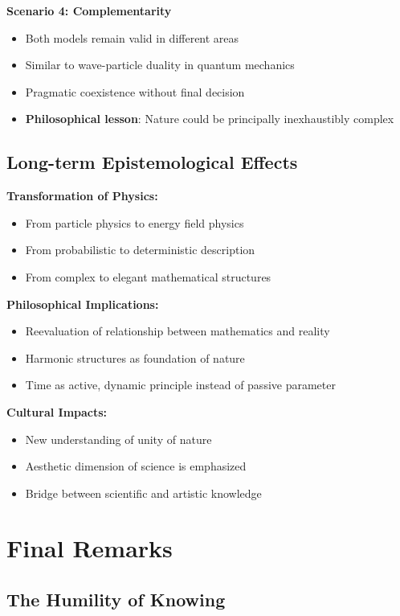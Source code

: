 \documentclass[12pt,a4paper]{report}
\begin{document}
	\textbf{Scenario 4: Complementarity}
	\begin{itemize}
		\item Both models remain valid in different areas
		\item Similar to wave-particle duality in quantum mechanics
		\item Pragmatic coexistence without final decision
		\item \textbf{Philosophical lesson}: Nature could be principally inexhaustibly complex
	\end{itemize}
	
	\subsection{Long-term Epistemological Effects}\label{subsec:longterm_effects}
	
	\textbf{Transformation of Physics:}
	\begin{itemize}
		\item From particle physics to energy field physics
		\item From probabilistic to deterministic description
		\item From complex to elegant mathematical structures
	\end{itemize}
	
	\textbf{Philosophical Implications:}
	\begin{itemize}
		\item Reevaluation of relationship between mathematics and reality
		\item Harmonic structures as foundation of nature
		\item Time as active, dynamic principle instead of passive parameter
	\end{itemize}
	
	\textbf{Cultural Impacts:}
	\begin{itemize}
		\item New understanding of unity of nature
		\item Aesthetic dimension of science is emphasized
		\item Bridge between scientific and artistic knowledge
	\end{itemize}
	
	\section{Final Remarks}\label{sec:final_remarks}
	
	\subsection{The Humility of Knowing}\label{subsec:humility_knowing}
	
\end{document}
